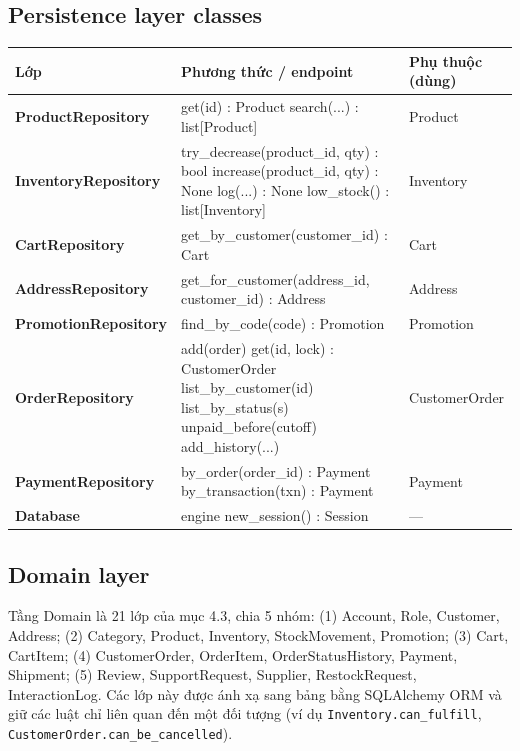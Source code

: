 \documentclass[12pt,a4paper,oneside]{report}
\begin{document}
\subsection{Persistence layer classes}
\begin{longtable}{@{}>{\raggedright\arraybackslash\small\bfseries}p{3.4cm}>{\raggedright\arraybackslash\ttfamily\footnotesize}p{7.2cm}>{\raggedright\arraybackslash\footnotesize}p{4.6cm}@{}}\toprule Lớp & Phương thức / endpoint & Phụ thuộc (dùng)\\\midrule\endhead
ProductRepository & get(id) : Product \newline search(...) : list[Product] & Product\\\midrule
InventoryRepository & try\_decrease(product\_id, qty) : bool \newline increase(product\_id, qty) : None \newline log(...) : None \newline low\_stock() : list[Inventory] & Inventory\\\midrule
CartRepository & get\_by\_customer(customer\_id) : Cart & Cart\\\midrule
AddressRepository & get\_for\_customer(address\_id, customer\_id) : Address & Address\\\midrule
PromotionRepository & find\_by\_code(code) : Promotion & Promotion\\\midrule
OrderRepository & add(order) \newline get(id, lock) : CustomerOrder \newline list\_by\_customer(id) \newline list\_by\_status(s) \newline unpaid\_before(cutoff) \newline add\_history(...) & CustomerOrder\\\midrule
PaymentRepository & by\_order(order\_id) : Payment \newline by\_transaction(txn) : Payment & Payment\\\midrule
Database & engine \newline new\_session() : Session & ---\\\midrule
\bottomrule\end{longtable}
\subsection{Domain layer}
Tầng Domain là 21 lớp của mục 4.3, chia 5 nhóm: (1) Account, Role, Customer, Address; (2) Category, Product, Inventory, StockMovement, Promotion; (3) Cart, CartItem; (4) CustomerOrder, OrderItem, OrderStatusHistory, Payment, Shipment; (5) Review, SupportRequest, Supplier, RestockRequest, InteractionLog. Các lớp này được ánh xạ sang bảng bằng SQLAlchemy ORM và giữ các luật chỉ liên quan đến một đối tượng (ví dụ \texttt{Inventory.can\_fulfill}, \texttt{CustomerOrder.can\_be\_cancelled}).
\end{document}
